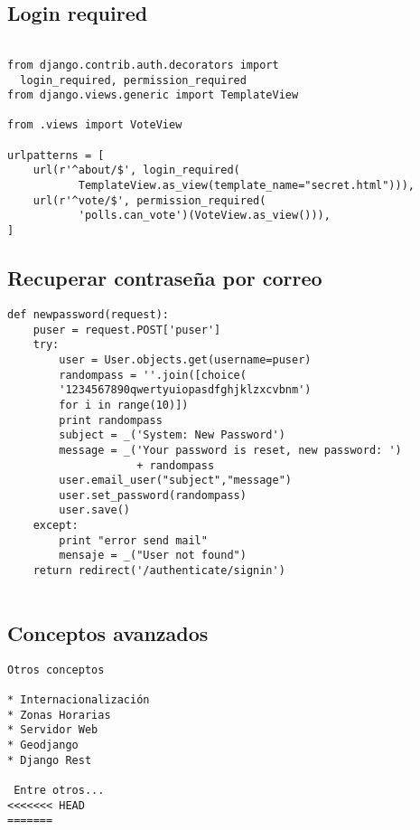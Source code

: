 \documentclass[xcolor=dvipsnames]{beamer}
\begin{document}
\subsection{Login required}
\begin{frame}[fragile]
\begin{verbatim}

from django.contrib.auth.decorators import 
  login_required, permission_required
from django.views.generic import TemplateView

from .views import VoteView

urlpatterns = [
    url(r'^about/$', login_required(
           TemplateView.as_view(template_name="secret.html"))),
    url(r'^vote/$', permission_required(
           'polls.can_vote')(VoteView.as_view())),
]

\end{verbatim}
\end{frame}

\subsection{Recuperar contraseña por correo}
\begin{frame}[fragile]
\begin{verbatim}
def newpassword(request):
    puser = request.POST['puser']
    try:
        user = User.objects.get(username=puser)
        randompass = ''.join([choice(
        '1234567890qwertyuiopasdfghjklzxcvbnm') 
        for i in range(10)])
        print randompass
        subject = _('System: New Password')
        message = _('Your password is reset, new password: ')
                    + randompass
        user.email_user("subject","message")
        user.set_password(randompass)
        user.save()
    except:
        print "error send mail"
        mensaje = _("User not found")
    return redirect('/authenticate/signin')
 
\end{verbatim}
\end{frame}

\subsection{Conceptos avanzados}
\begin{frame}[fragile]
\begin{verbatim}
Otros conceptos

* Internacionalización
* Zonas Horarias
* Servidor Web
* Geodjango
* Django Rest

 Entre otros...
<<<<<<< HEAD
=======

\end{verbatim}
\end{frame}
\end{document}
